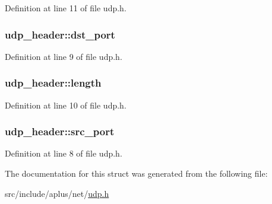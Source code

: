 Definition at line 11 of file udp.\+h.

\hypertarget{structudp__header_a0cabb64601f3523a8defb137a90da96a}{
\subsubsection[{dst\+\_\+port}]{ udp\+\_\+header\+::dst\+\_\+port}}\label{structudp__header_a0cabb64601f3523a8defb137a90da96a}


Definition at line 9 of file udp.\+h.

\hypertarget{structudp__header_a8129128b23a79dad769fc422f7b1c12b}{
\subsubsection[{length}]{ udp\+\_\+header\+::length}}\label{structudp__header_a8129128b23a79dad769fc422f7b1c12b}


Definition at line 10 of file udp.\+h.

\hypertarget{structudp__header_ac0f7a492b8b7dd8e425d6517c7e9b3c2}{
\subsubsection[{src\+\_\+port}]{ udp\+\_\+header\+::src\+\_\+port}}\label{structudp__header_ac0f7a492b8b7dd8e425d6517c7e9b3c2}


Definition at line 8 of file udp.\+h.



The documentation for this struct was generated from the following file\+:\begin{DoxyCompactItemize}
\item 
src/include/aplus/net/\hyperlink{udp_8h}{udp.\+h}\end{DoxyCompactItemize}
